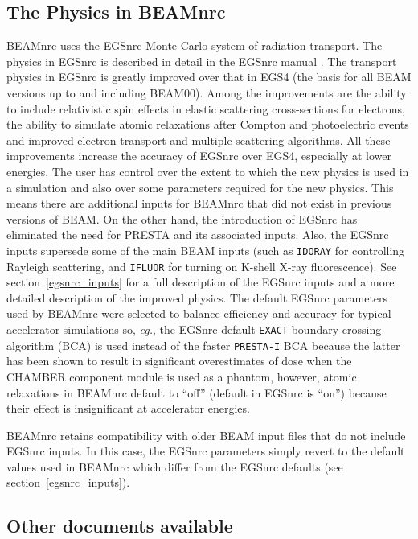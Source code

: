 \documentclass[12pt,twoside]{article}
\newcommand{\eg}{{\em eg.}}
\begin{document}
\subsection{The Physics in BEAMnrc}

BEAMnrc uses the EGSnrc Monte Carlo system of radiation transport.  The
physics in EGSnrc is described in detail in the EGSnrc manual
\cite{KR03}.  The transport physics in EGSnrc is greatly improved
over that in EGS4 (the basis for all BEAM versions up to and including
BEAM00).  Among the improvements are the ability to include relativistic
spin effects in elastic scattering cross-sections for electrons, the ability
to simulate atomic relaxations after Compton and photoelectric events and
improved electron transport and multiple scattering algorithms.
All these improvements increase the accuracy of EGSnrc over EGS4, especially at lower energies.
The user has control over the extent to which the new physics is used in
a simulation and also over some parameters required for the new physics.  This
means there are additional inputs for BEAMnrc that did not exist in
previous versions of BEAM.   On the other hand, the introduction of EGSnrc
has eliminated the need for PRESTA and its associated inputs. Also,
the EGSnrc inputs supersede some of the main BEAM inputs
(such as {\tt IDORAY} for controlling Rayleigh scattering, and
{\tt IFLUOR} for turning on K-shell X-ray fluorescence).  See
section~\ref{egsnrc_inputs} for a full description of the EGSnrc inputs
and a more detailed description of the improved physics.  The default
EGSnrc parameters used by BEAMnrc were selected to balance efficiency and
accuracy for typical accelerator simulations so,
\eg, the EGSnrc default {\tt EXACT} boundary crossing algorithm (BCA) is
used instead of the faster {\tt PRESTA-I} BCA because the latter has
been shown to result in significant overestimates of dose when the
CHAMBER component module is used as a phantom\cite{WK06}, however,
atomic relaxations in BEAMnrc default to ``off'' (default in EGSnrc is ``on'')
because their effect is insignificant at accelerator energies.

BEAMnrc retains compatibility with older BEAM input files that do not
include EGSnrc inputs.  In this case, the EGSnrc parameters simply
revert to the default values used in BEAMnrc which differ from the EGSnrc
defaults (see section~\ref{egsnrc_inputs}).


\subsection{Other documents available}
\label{oda}
\end{document}
